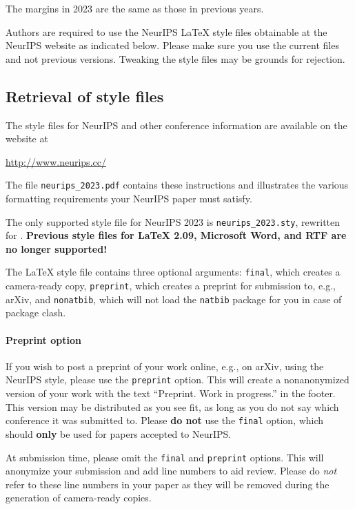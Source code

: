 \documentclass{article}
\begin{document}
The margins in 2023 are the same as those in previous years.


Authors are required to use the NeurIPS \LaTeX{} style files obtainable at the
NeurIPS website as indicated below. Please make sure you use the current files
and not previous versions. Tweaking the style files may be grounds for
rejection.


\subsection{Retrieval of style files}


The style files for NeurIPS and other conference information are available on
the website at
\begin{center}
  \url{http://www.neurips.cc/}
\end{center}
The file \verb+neurips_2023.pdf+ contains these instructions and illustrates the
various formatting requirements your NeurIPS paper must satisfy.


The only supported style file for NeurIPS 2023 is \verb+neurips_2023.sty+,
rewritten for \LaTeXe{}.  \textbf{Previous style files for \LaTeX{} 2.09,
  Microsoft Word, and RTF are no longer supported!}


The \LaTeX{} style file contains three optional arguments: \verb+final+, which
creates a camera-ready copy, \verb+preprint+, which creates a preprint for
submission to, e.g., arXiv, and \verb+nonatbib+, which will not load the
\verb+natbib+ package for you in case of package clash.


\paragraph{Preprint option}
If you wish to post a preprint of your work online, e.g., on arXiv, using the
NeurIPS style, please use the \verb+preprint+ option. This will create a
nonanonymized version of your work with the text ``Preprint. Work in progress.''
in the footer. This version may be distributed as you see fit, as long as you do not say which conference it was submitted to. Please \textbf{do
  not} use the \verb+final+ option, which should \textbf{only} be used for
papers accepted to NeurIPS.


At submission time, please omit the \verb+final+ and \verb+preprint+
options. This will anonymize your submission and add line numbers to aid
review. Please do \emph{not} refer to these line numbers in your paper as they
will be removed during the generation of camera-ready copies.
\end{document}
